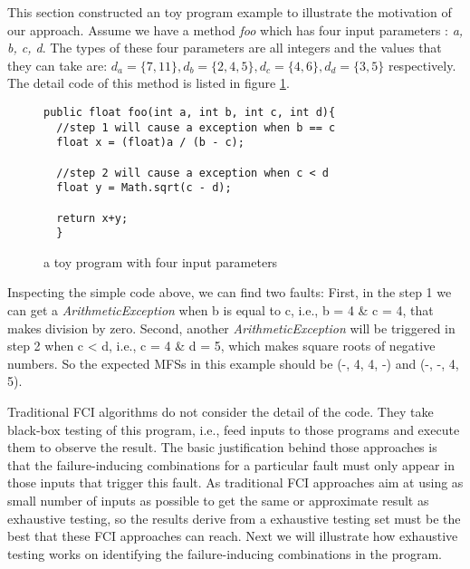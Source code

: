 \documentclass{sig-alternate}
\begin{document}
This section constructed an toy program example to illustrate the motivation of our approach. Assume we have a method \emph{foo} which has four input parameters : \emph{a, b, c, d}. The types of these four parameters are all integers and the values that they can take are: $d_{a} = \{7, 11\}, d_{b} = \{2, 4, 5\}, d_{c} = \{4, 6\}, d_{d} = \{3, 5\}$ respectively.  The detail code of this method is listed in figure \ref{toy-program}.
\begin{figure}
\begin{verbatim}
public float foo(int a, int b, int c, int d){
  //step 1 will cause a exception when b == c
  float x = (float)a / (b - c);

  //step 2 will cause a exception when c < d
  float y = Math.sqrt(c - d);

  return x+y;
  }
\end{verbatim}
\caption{a toy program with four input parameters}
\label{toy-program}
\end{figure}

Inspecting the simple code above, we can find two faults: First, in the step 1 we can get a \emph{ArithmeticException} when b is equal to c, i.e.,  b = 4 \& c = 4, that makes division by zero. Second, another \emph{ArithmeticException} will be triggered in step 2 when c < d, i.e., c = 4 \& d = 5, which makes square roots of negative numbers. So the expected MFSs in this example should be (-, 4, 4, -) and (-, -, 4, 5).

Traditional FCI algorithms do not consider the detail of the code. They take black-box testing of this program, i.e., feed inputs to those programs and execute them to observe the result. The basic justification behind those approaches is that the failure-inducing combinations for a particular fault must only appear in those inputs that trigger this fault. As traditional FCI approaches aim at using as small number of inputs as possible to get the same or approximate result as exhaustive testing, so the results derive from a exhaustive testing set must be the best that these FCI approaches can reach. Next we will illustrate how exhaustive testing works on identifying the failure-inducing combinations in the program.
\end{document}
